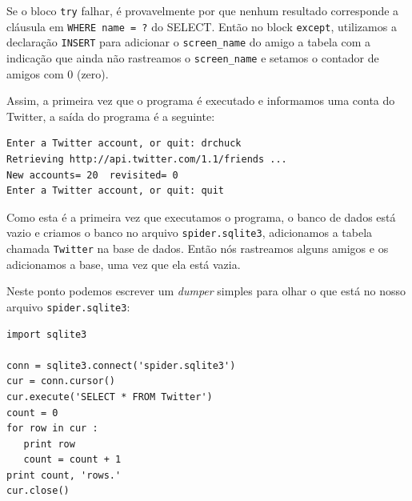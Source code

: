 
Se o bloco {\tt try} falhar, é provavelmente por que nenhum resultado
corresponde a cláusula em {\tt WHERE name = ?} do SELECT. Então no block
{\tt except}, utilizamos a declaração {\tt INSERT} para adicionar o
\verb"screen_name" do amigo a tabela com a indicação que ainda não rastreamos
o \verb"screen_name" e setamos o contador de amigos com 0 (zero).


Assim, a primeira vez que o programa é executado e informamos uma conta do
Twitter, a saída do programa é a seguinte:

\beforeverb
\begin{verbatim}
Enter a Twitter account, or quit: drchuck
Retrieving http://api.twitter.com/1.1/friends ...
New accounts= 20  revisited= 0
Enter a Twitter account, or quit: quit
\end{verbatim}
\afterverb
%

Como esta é a primeira vez que executamos o programa, o banco de dados está
vazio e criamos o banco no arquivo {\tt spider.sqlite3}, adicionamos a tabela
chamada {\tt Twitter} na base de dados. Então nós rastreamos alguns amigos e
os adicionamos a base, uma vez que ela está vazia.


Neste ponto podemos escrever um {\it dumper} simples para olhar o que está no
nosso arquivo {\tt spider.sqlite3}:

\beforeverb
\begin{verbatim}
import sqlite3

conn = sqlite3.connect('spider.sqlite3')
cur = conn.cursor()
cur.execute('SELECT * FROM Twitter')
count = 0
for row in cur :
   print row
   count = count + 1
print count, 'rows.'
cur.close()
\end{verbatim}
\afterverb
%

